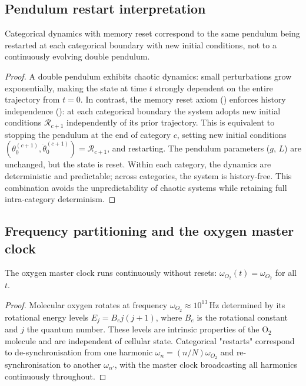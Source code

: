 \subsection{Pendulum restart interpretation}

\begin{theorem}
\label{thm:ch07-pendulum-restart}
Categorical dynamics with memory reset correspond to the same pendulum being
restarted at each categorical boundary with new initial conditions, not to a
continuously evolving double pendulum.
\end{theorem}

\begin{proof}
A double pendulum exhibits chaotic dynamics: small perturbations grow
exponentially, making the state at time $t$ strongly dependent on the entire
trajectory from $t = 0$.  In contrast, the memory reset axiom
() enforces history independence
(): at each categorical boundary the
system adopts new initial conditions $\mathcal{R}_{c+1}$ independently of
its prior trajectory.  This is equivalent to stopping the pendulum at the
end of category $c$, setting new initial conditions
$(\theta_0^{(c+1)}, \dot{\theta}_0^{(c+1)}) = \mathcal{R}_{c+1}$, and
restarting.  The pendulum parameters ($g$, $L$) are unchanged, but the
state is reset.  Within each category, the dynamics are deterministic and
predictable; across categories, the system is history-free.  This
combination avoids the unpredictability of chaotic systems while retaining
full intra-category determinism.
\end{proof}

\subsection{Frequency partitioning and the oxygen master clock}

\begin{theorem}
\label{thm:ch07-master-clock}
The oxygen master clock runs continuously without resets:
$\omega_{O_2}(t) = \omega_{O_2}$ for all $t$.
\end{theorem}

\begin{proof}
Molecular oxygen rotates at frequency $\omega_{O_2} \approx 10^{13}$\,Hz
determined by its rotational energy levels $E_j = B_e j(j+1)$, where $B_e$
is the rotational constant and $j$ the quantum number.  These levels are
intrinsic properties of the O$_2$ molecule and are independent of cellular
state.  Categorical "restarts" correspond to de-synchronisation from one
harmonic $\omega_n = (n/N)\omega_{O_2}$ and re-synchronisation to another
$\omega_{n'}$, with the master clock broadcasting all harmonics continuously
throughout.
\end{proof}

